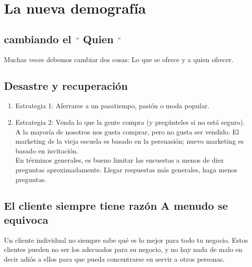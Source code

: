 \documentclass[10pt]{book}
\begin{document}
    \chapter{La nueva demografía}
	\section{cambiando el $"$ Quien $"$} 
	Muchas veces debemos cambiar dos cosas: Lo que se ofrece y a quien ofrecer.

	\section{Desastre y recuperación}
	\begin{enumerate}[\bfseries 1.]
		\item Estrategia 1: Aferrarse a un pasatiempo, pasión o moda popular.
		\item Estrategia 2: Venda lo que la gente compra (y pregúnteles si no está seguro).\\
		A la mayoría de nosotros nos gusta comprar, pero no gusta ser vendido. El marketing de la vieja escuela es basado en la persuasión; nuevo marketing es basado en invitación.\\
		En términos generales, es bueno limitar las encuestas a menos de diez preguntas aproximadamente. Llegar respuestas más generales, haga menos preguntas.
	\end{enumerate}
	    
	\section{El cliente siempre tiene razón A menudo se equivoca}
	Un cliente individual no siempre sabe qué es lo mejor para todo tu negocio. Estos clientes pueden no ser los adecuados para su negocio, y no hay nada de malo en decir adiós a ellos para que pueda concentrarse en servir a otros personas.
	
\end{document}
